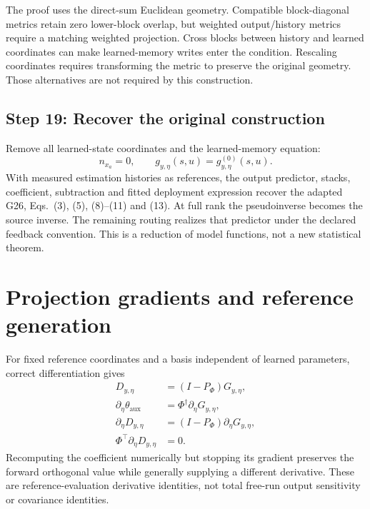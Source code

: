 \documentclass[11pt,a4paper]{article}
\begin{document}
The proof uses the direct-sum Euclidean geometry. Compatible block-diagonal metrics retain zero lower-block overlap, but weighted output/history metrics require a matching weighted projection. Cross blocks between history and learned coordinates can make learned-memory writes enter the condition. Rescaling coordinates requires transforming the metric to preserve the original geometry. Those alternatives are not required by this construction.

\subsection*{Step 19: Recover the original construction}
Remove all learned-state coordinates and the learned-memory equation:
\begin{equation}\label{eq:reduction}
n_{x_a}=0,\qquad g_{y,\eta}(s,u)=g_{y,\eta}^{(0)}(s,u).
\end{equation}
With measured estimation histories as references, the output predictor, stacks, coefficient, subtraction and fitted deployment expression recover the adapted G26, Eqs.\ (3), (5), (8)--(11) and (13). At full rank the pseudoinverse becomes the source inverse. The remaining routing realizes that predictor under the declared feedback convention. This is a reduction of model functions, not a new statistical theorem.

\appendix
\section{Projection gradients and reference generation}\label{sec:derivatives}
For fixed reference coordinates and a basis independent of learned parameters, correct differentiation gives
\begin{equation}\label{eq:derivatives}
\begin{aligned}
D_{y,\eta}&=(I-P_\Phi)G_{y,\eta},\\
\partial_\eta \theta_{\mathrm{aux}}&=\Phi^\dagger\partial_\eta G_{y,\eta},\\
\partial_\eta D_{y,\eta}&=(I-P_\Phi)\partial_\eta G_{y,\eta},\\
\Phi^\top\partial_\eta D_{y,\eta}&=0.
\end{aligned}
\end{equation}
Recomputing the coefficient numerically but stopping its gradient preserves the forward orthogonal value while generally supplying a different derivative. These are reference-evaluation derivative identities, not total free-run output sensitivity or covariance identities.
\end{document}
